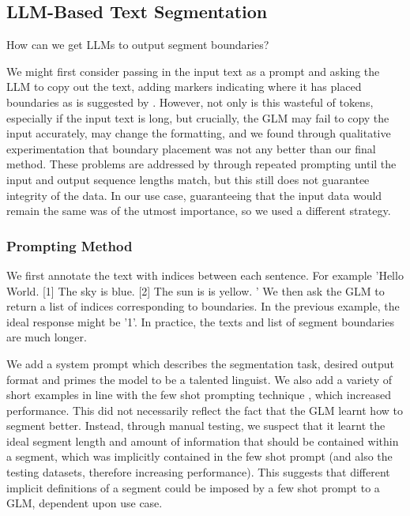 
\subsection{LLM-Based Text Segmentation}\label{LLM-Based Text Segmentation}


How can we get LLMs to output segment boundaries?

We might first consider passing in the input text as a prompt and asking the LLM to copy out the text, adding markers indicating where it has placed boundaries as is suggested by \cite{XingThesis}. However, not only is this wasteful of tokens, especially if the input text is long, but crucially, the GLM may fail to copy the input accurately, may change the formatting, and we found through qualitative experimentation that boundary placement was not any better than our final method. These problems are addressed by \cite{XingThesis} through repeated prompting until the input and output sequence lengths match, but this still does not guarantee integrity of the data. In our use case, guaranteeing that the input data would remain the same was of the utmost importance, so we used a different strategy.

\subsubsection{Prompting Method}

We first annotate the text with indices between each sentence. For example 'Hello World. [1] The sky is blue. [2] The sun is is yellow. ' We then ask the GLM to return a list of indices corresponding to boundaries. In the previous example, the ideal response might be '1'. In practice, the texts and list of segment boundaries are much longer.

We add a system prompt which describes the segmentation task, desired output format and primes the model to be a talented linguist. We also add a variety of short examples in line with the few shot prompting technique \cite{FewShotLearners}, which increased performance. This did not necessarily reflect the fact that the GLM learnt how to segment better. Instead, through manual testing, we suspect that it learnt the ideal segment length and amount of information that should be contained within a segment, which was implicitly contained in the few shot prompt (and also the testing datasets, therefore increasing performance). This suggests that different implicit definitions of a segment could be imposed by a few shot prompt to a GLM, dependent upon use case.

